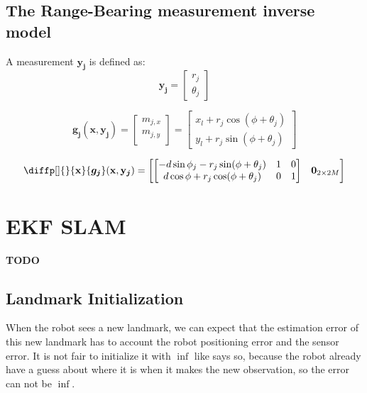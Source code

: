 \documentclass[12pt]{article}
\newcommand{\bvec}[1]{\mathbf{#1}} %
\newcommand{\mat}[1]{\mathbf{#1}}
\newcommand{\mb}[1]{{\boldsymbol{#1}}} %
\newcommand{\matnull}[2]{\mat{0}_{#1\times#2}} %
\newcommand{\blue}[1]{\color{blue}#1\color{black}}
\begin{document}
\subsection{The Range-Bearing measurement inverse model}
A measurement $\bvec{y}_\mb{j}$ is defined as:
\begin{equation}
    \bvec{y}_\mb{j} = \begin{bmatrix}
        r_j \\ 
        \theta_j \end{bmatrix}
\end{equation}

\begin{equation}
    \mb{g_j}(\bvec{x}, \bvec{y}_\mb{j}) = 
    \begin{bmatrix}
        m_{j, x} \\
        m_{j, y} \\
    \end{bmatrix} =
    \begin{bmatrix}
        x_l + r_j \cos(\phi + \theta_j)\\
        y_l + r_j \sin(\phi + \theta_j) 
    \end{bmatrix}
    \label{eq:measurement-inverse-model}
\end{equation}

\begin{equation}
    \diffp[]{}{\bvec{x}} \mb{g_j}(\bvec{x}, \bvec{y}_\mb{j}) = \begin{bmatrix}\begin{bmatrix}
        -d \sin{\phi_j} - r_j \sin(\phi + \theta_j)  & 1 & 0\\
        d\cos{\phi} + r_j\cos(\phi + \theta_j) & 0 & 1
    \end{bmatrix} & \matnull{2}{2M}\end{bmatrix}
\end{equation}

\section{EKF SLAM}
\blue{\textbf{TODO}}

\subsection{Landmark Initialization}
When the robot sees a new landmark, we can expect that the estimation error of this new landmark has to account the robot positioning error and the sensor error. It is not fair to initialize it with $\inf$ like \cite[p.~ ]{bongard2006probabilistic} says so, because the robot already have a guess about where it is when it makes the new observation, so the error can not be $\inf$.
\end{document}
